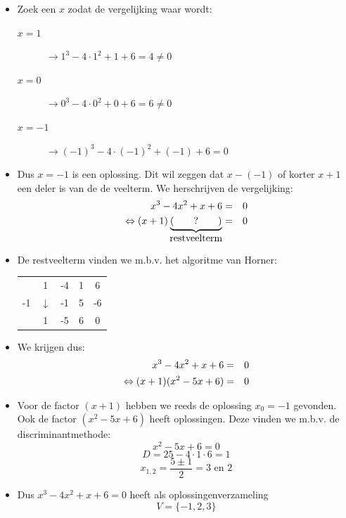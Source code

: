 \documentclass[12pt,twoside,a4paper]{article}
\begin{document}
\begin{itemize}
\item Zoek een $x$ zodat de vergelijking waar wordt:
  \begin{description}
  \item[$x=1$] $\rightarrow 1^3-4\cdot 1^2+1+6 = 4 \neq 0$
  \item[$x=0$] $\rightarrow 0^3-4\cdot 0^2+0+6 = 6 \neq 0$
  \item[$x=-1$] $\rightarrow (-1)^3-4\cdot (-1)^2+(-1)+6 = 0$
  \end{description}
\item Dus $x=-1$ is een oplossing. Dit wil zeggen dat $x-(-1)$ of korter $x+1$ een deler is van de de veelterm. We herschrijven de vergelijking:
  \begin{eqnarray*}
    x^3-4x^2+x+6&=&0\\
    \Leftrightarrow (x+1)\underbrace{(\qquad ? \qquad)}_{\mbox{restveelterm}}&=&0\\
  \end{eqnarray*}
\item De restveelterm vinden we m.b.v. het algoritme van Horner:
  \begin{center}
    \begin{tabular}{c|cccc}
      & 1 & -4 & 1 & 6\\
      -1 & $\downarrow$ & -1 & 5 & -6\\
      \hline
      & 1 & -5 & 6 & 0
    \end{tabular}
  \end{center}
\item We krijgen dus:
  \begin{eqnarray*}
    x^3-4x^2+x+6&=&0\\
    \Leftrightarrow (x+1)(x^2-5x+6)&=&0\\
  \end{eqnarray*}
\item Voor de factor $(x+1)$ hebben we reeds de oplossing $x_0=-1$ gevonden. Ook de factor $(x^2-5x+6)$ heeft oplossingen. Deze vinden we m.b.v. de discriminantmethode:
  $$x^2-5x+6=0$$
  $$D=25-4\cdot 1\cdot 6=1$$
  $$x_{1,2}=\dfrac{5\pm 1}{2}=3\mbox{ en }2$$
\item Dus $x^3-4x^2+x+6=0$ heeft als oplossingenverzameling
  $$V=\{-1, 2, 3\}$$
\end{itemize}
\end{document}
